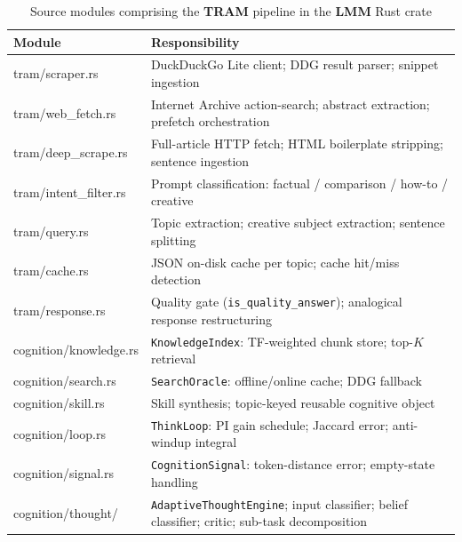 \documentclass[11pt,a4paper]{article}
\newcommand{\lmm}{\texorpdfstring{%
  \textbf{\color{lmmAccent}LMM}}{LMM}}
\newcommand{\tram}{\texorpdfstring{%
  \textbf{\color{lmmTeal}TRAM}}{TRAM}}
\begin{document}
\begin{table}[H]
\centering
\caption{Source modules comprising the \tram{} pipeline in the \lmm{} Rust crate}
\label{tab:modules}
\renewcommand{\arraystretch}{1.3}
\begin{tabularx}{\linewidth}{@{}>{\ttfamily\small}p{4.2cm} X@{}}
\toprule
\rowcolor{lmmHeaderBg}
{\color{white}\normalfont\textbf{Module}} &
{\color{white}\textbf{Responsibility}} \\
\midrule
\rowcolor{white}     tram/scraper.rs              & DuckDuckGo Lite client; DDG result parser; snippet ingestion \\
\rowcolor{lmmRowAlt} tram/web\_fetch.rs           & Internet Archive action-search; abstract extraction; prefetch orchestration \\
\rowcolor{white}     tram/deep\_scrape.rs         & Full-article HTTP fetch; HTML boilerplate stripping; sentence ingestion \\
\rowcolor{lmmRowAlt} tram/intent\_filter.rs       & Prompt classification: factual / comparison / how-to / creative \\
\rowcolor{white}     tram/query.rs                & Topic extraction; creative subject extraction; sentence splitting \\
\rowcolor{lmmRowAlt} tram/cache.rs                & JSON on-disk cache per topic; cache hit/miss detection \\
\rowcolor{white}     tram/response.rs             & Quality gate (\texttt{is\_quality\_answer}); analogical response restructuring \\
\rowcolor{lmmRowAlt} cognition/knowledge.rs       & \texttt{KnowledgeIndex}: TF-weighted chunk store; top-$K$ retrieval \\
\rowcolor{white}     cognition/search.rs          & \texttt{SearchOracle}: offline/online cache; DDG fallback \\
\rowcolor{lmmRowAlt} cognition/skill.rs           & Skill synthesis; topic-keyed reusable cognitive object \\
\rowcolor{white}     cognition/loop.rs            & \texttt{ThinkLoop}: PI gain schedule; Jaccard error; anti-windup integral \\
\rowcolor{lmmRowAlt} cognition/signal.rs          & \texttt{CognitionSignal}: token-distance error; empty-state handling \\
\rowcolor{white}     cognition/thought/           & \texttt{AdaptiveThoughtEngine}; input classifier; belief classifier; critic; sub-task decomposition \\

\end{tabularx}
\end{table}
\end{document}
